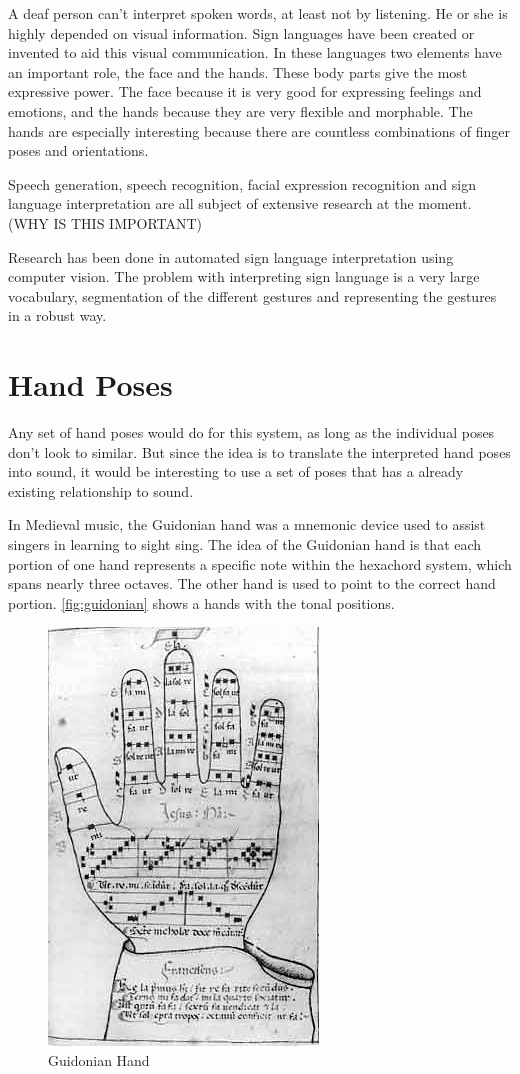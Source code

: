 A deaf person can't interpret spoken words, at least not by listening. He or she is highly depended on visual information. Sign languages have been created or invented to aid this visual communication. In these languages two elements have an important role, the face and the hands. These body parts give the most expressive power. The face because it is very good for expressing feelings and emotions, and the hands because they are very flexible and morphable. The hands are especially interesting because there are countless combinations of finger poses and orientations. 

Speech generation, speech recognition, facial expression recognition and sign language interpretation are all subject of extensive research at the moment. (WHY IS THIS IMPORTANT)

Research has been done in automated sign language interpretation using computer vision\cite{Buehler2009}\cite{RichardBowden2004}. The problem with interpreting sign language is a very large vocabulary, segmentation of the different gestures and representing the gestures in a robust way.


\section{Hand Poses}

Any set of hand poses would do for this system, as long as the individual poses don't look to similar. But since the idea is to translate the interpreted hand poses into sound, it would be interesting to use a set of poses that has a already existing relationship to sound.

In Medieval music, the Guidonian hand was a mnemonic device used to assist singers in learning to sight sing. The idea of the Guidonian hand is that each portion of one hand represents a specific note within the hexachord system, which spans nearly three octaves. The other hand is used to point to the correct hand portion. \autoref{fig:guidonian} shows a hands with the tonal positions.

\begin{figure}[htbp]
	\centering{}
	\includegraphics[width=0.3\linewidth]{figures/guidonian_hand.jpg}
	\caption{Guidonian Hand}
	\label{fig:guidonian}
\end{figure}

